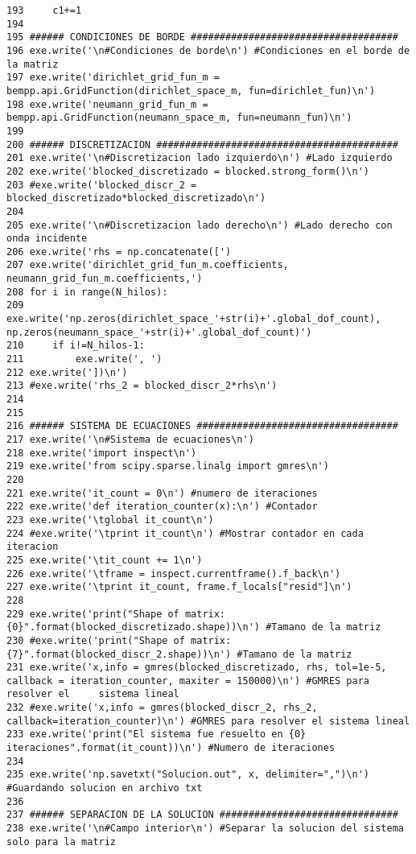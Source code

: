 \documentclass[12pt,letterpaper]{report}
\numberwithin{equation}{section}
\begin{document}
\begin{lstlisting}
193     c1+=1
194 
195 ###### CONDICIONES DE BORDE ####################################
196 exe.write('\n#Condiciones de borde\n') #Condiciones en el borde de la matriz
197 exe.write('dirichlet_grid_fun_m = bempp.api.GridFunction(dirichlet_space_m, fun=dirichlet_fun)\n')
198 exe.write('neumann_grid_fun_m = bempp.api.GridFunction(neumann_space_m, fun=neumann_fun)\n')
199 
200 ###### DISCRETIZACION ##########################################
201 exe.write('\n#Discretizacion lado izquierdo\n') #Lado izquierdo
202 exe.write('blocked_discretizado = blocked.strong_form()\n')
203 #exe.write('blocked_discr_2 = blocked_discretizado*blocked_discretizado\n')
204 
205 exe.write('\n#Discretizacion lado derecho\n') #Lado derecho con onda incidente
206 exe.write('rhs = np.concatenate([')
207 exe.write('dirichlet_grid_fun_m.coefficients, neumann_grid_fun_m.coefficients,')
208 for i in range(N_hilos):
209     exe.write('np.zeros(dirichlet_space_'+str(i)+'.global_dof_count), np.zeros(neumann_space_'+str(i)+'.global_dof_count)')
210     if i!=N_hilos-1:
211         exe.write(', ')
212 exe.write('])\n')
213 #exe.write('rhs_2 = blocked_discr_2*rhs\n')
214 
215 
216 ###### SISTEMA DE ECUACIONES ###################################
217 exe.write('\n#Sistema de ecuaciones\n')
218 exe.write('import inspect\n')
219 exe.write('from scipy.sparse.linalg import gmres\n')
220 
221 exe.write('it_count = 0\n') #numero de iteraciones
222 exe.write('def iteration_counter(x):\n') #Contador
223 exe.write('\tglobal it_count\n')
224 #exe.write('\tprint it_count\n') #Mostrar contador en cada iteracion
225 exe.write('\tit_count += 1\n')
226 exe.write('\tframe = inspect.currentframe().f_back\n')
227 exe.write('\tprint it_count, frame.f_locals["resid"]\n')
228 
229 exe.write('print("Shape of matrix: {0}".format(blocked_discretizado.shape))\n') #Tamano de la matriz
230 #exe.write('print("Shape of matrix: {7}".format(blocked_discr_2.shape))\n') #Tamano de la matriz
231 exe.write('x,info = gmres(blocked_discretizado, rhs, tol=1e-5, callback = iteration_counter, maxiter = 150000)\n') #GMRES para resolver el     sistema lineal
232 #exe.write('x,info = gmres(blocked_discr_2, rhs_2, callback=iteration_counter)\n') #GMRES para resolver el sistema lineal
233 exe.write('print("El sistema fue resuelto en {0} iteraciones".format(it_count))\n') #Numero de iteraciones
234 
235 exe.write('np.savetxt("Solucion.out", x, delimiter=",")\n') #Guardando solucion en archivo txt
236 
237 ###### SEPARACION DE LA SOLUCION ###############################
238 exe.write('\n#Campo interior\n') #Separar la solucion del sistema solo para la matriz

\end{lstlisting}
\end{document}
